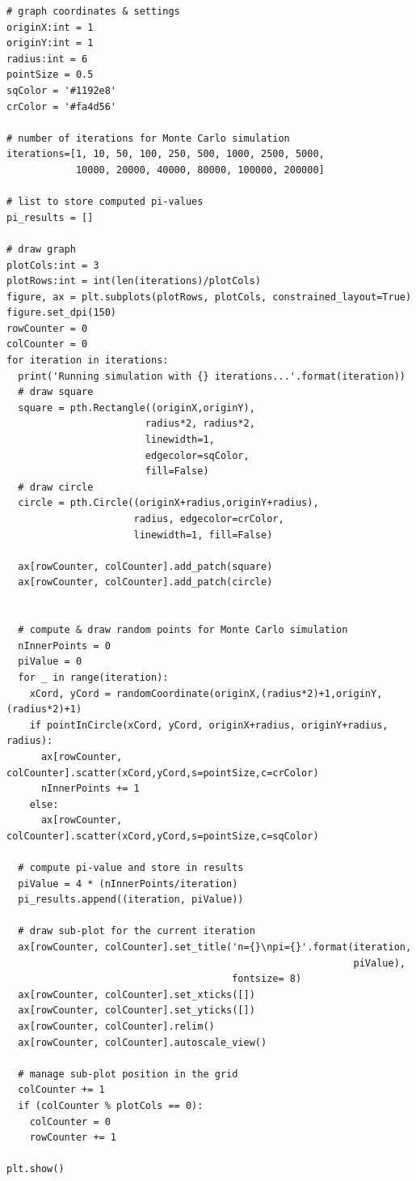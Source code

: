 \documentclass[UTF8, letter]{article}
\begin{document}
\begin{codeblock}
\begin{verbatim}
# graph coordinates & settings
originX:int = 1
originY:int = 1
radius:int = 6
pointSize = 0.5
sqColor = '#1192e8'
crColor = '#fa4d56'

# number of iterations for Monte Carlo simulation
iterations=[1, 10, 50, 100, 250, 500, 1000, 2500, 5000, 
            10000, 20000, 40000, 80000, 100000, 200000]

# list to store computed pi-values
pi_results = []

# draw graph
plotCols:int = 3
plotRows:int = int(len(iterations)/plotCols)
figure, ax = plt.subplots(plotRows, plotCols, constrained_layout=True)
figure.set_dpi(150)
rowCounter = 0
colCounter = 0
for iteration in iterations:
  print('Running simulation with {} iterations...'.format(iteration))
  # draw square
  square = pth.Rectangle((originX,originY),
                        radius*2, radius*2,
                        linewidth=1, 
                        edgecolor=sqColor,
                        fill=False)
  # draw circle
  circle = pth.Circle((originX+radius,originY+radius),
                      radius, edgecolor=crColor, 
                      linewidth=1, fill=False) 
  
  ax[rowCounter, colCounter].add_patch(square)
  ax[rowCounter, colCounter].add_patch(circle)


  # compute & draw random points for Monte Carlo simulation
  nInnerPoints = 0
  piValue = 0
  for _ in range(iteration):
    xCord, yCord = randomCoordinate(originX,(radius*2)+1,originY,(radius*2)+1)
    if pointInCircle(xCord, yCord, originX+radius, originY+radius, radius):
      ax[rowCounter, colCounter].scatter(xCord,yCord,s=pointSize,c=crColor)
      nInnerPoints += 1
    else:
      ax[rowCounter, colCounter].scatter(xCord,yCord,s=pointSize,c=sqColor) 

  # compute pi-value and store in results
  piValue = 4 * (nInnerPoints/iteration)
  pi_results.append((iteration, piValue))

  # draw sub-plot for the current iteration
  ax[rowCounter, colCounter].set_title('n={}\npi={}'.format(iteration, 
                                                            piValue), 
                                       fontsize= 8)
  ax[rowCounter, colCounter].set_xticks([])
  ax[rowCounter, colCounter].set_yticks([]) 
  ax[rowCounter, colCounter].relim()
  ax[rowCounter, colCounter].autoscale_view()      

  # manage sub-plot position in the grid
  colCounter += 1
  if (colCounter % plotCols == 0):
    colCounter = 0
    rowCounter += 1

plt.show()
\end{verbatim}
\end{codeblock}
\end{document}
